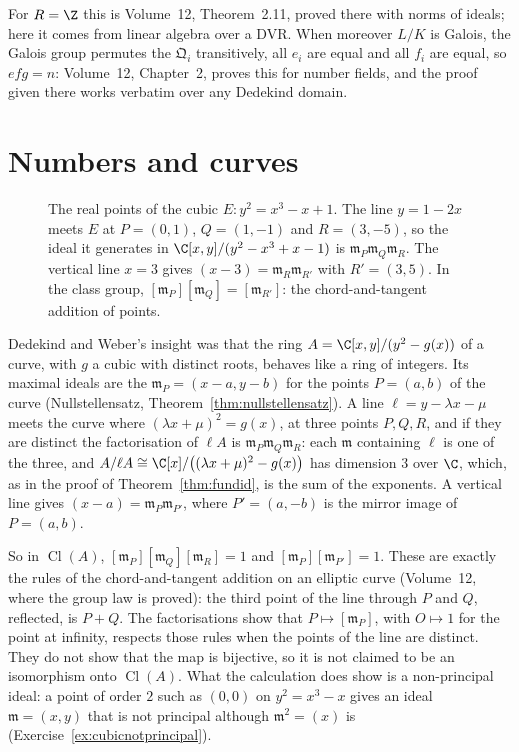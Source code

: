 For $R=\Z$ this is Volume~12, Theorem~2.11, proved there with norms of ideals; here it comes from linear algebra over a DVR. When moreover $L/K$ is Galois, the Galois group permutes the $\mathfrak Q_i$ transitively, all $e_i$ are
equal and all $f_i$ are equal, so $efg=n$: Volume~12, Chapter~2, proves this for number fields, and the proof given there works verbatim over any Dedekind domain.

\section{Numbers and curves}

\begin{figure}[ht]
\centering
{}
\caption{The real points of the cubic $E\colon y^2=x^3-x+1$. The line $y=1-2x$ meets $E$ at $P=(0,1)$, $Q=(1,-1)$ and $R=(3,-5)$, so the ideal it generates in $\C[x,y]/(y^2-x^3+x-1)$ is $\mathfrak m_P\mathfrak m_Q\mathfrak m_R$.
The vertical line $x=3$ gives $(x-3)=\mathfrak m_R\mathfrak m_{R'}$ with $R'=(3,5)$. In the class group, $[\mathfrak m_P][\mathfrak m_Q]=[\mathfrak m_{R'}]$: the chord-and-tangent addition of points.}
\label{fig:cubicclass}
\end{figure}

Dedekind and Weber's insight was that the ring $A=\C[x,y]/(y^2-g(x))$ of a curve, with $g$ a cubic with distinct roots, behaves like a ring of integers. Its maximal ideals are the $\mathfrak m_P=(x-a,y-b)$ for the points
$P=(a,b)$ of the curve (Nullstellensatz, Theorem~\ref{thm:nullstellensatz}). A line $\ell=y-\lambda x-\mu$ meets the curve where $(\lambda x+\mu)^2=g(x)$, at three points $P,Q,R$, and if they are distinct the factorisation of
$\ell A$ is $\mathfrak m_P\mathfrak m_Q\mathfrak m_R$: each $\mathfrak m$ containing $\ell$ is one of the three, and $A/\ell A\cong\C[x]/\bigl((\lambda x+\mu)^2-g(x)\bigr)$ has dimension $3$ over $\C$, which, as in the proof of
Theorem~\ref{thm:fundid}, is the sum of the exponents. A vertical line gives $(x-a)=\mathfrak m_P\mathfrak m_{P'}$, where $P'=(a,-b)$ is the mirror image of $P=(a,b)$.

So in $\operatorname{Cl}(A)$, $[\mathfrak m_P][\mathfrak m_Q][\mathfrak m_R]=1$ and $[\mathfrak m_P][\mathfrak m_{P'}]=1$. These are exactly the rules of the chord-and-tangent addition on an elliptic curve (Volume~12, where the group law is proved): the
third point of the line through $P$ and $Q$, reflected, is $P+Q$. The factorisations show that $P\mapsto[\mathfrak m_P]$, with $O\mapsto1$ for the point at infinity, respects those rules when the points of the line are distinct. They do not show that the map is bijective, so it is not claimed to be an isomorphism onto $\operatorname{Cl}(A)$. What the calculation does show is a non-principal ideal: a point of order $2$ such as $(0,0)$ on $y^2=x^3-x$ gives an
ideal $\mathfrak m=(x,y)$ that is not principal although $\mathfrak m^2=(x)$ is (Exercise~\ref{ex:cubicnotprincipal}).

